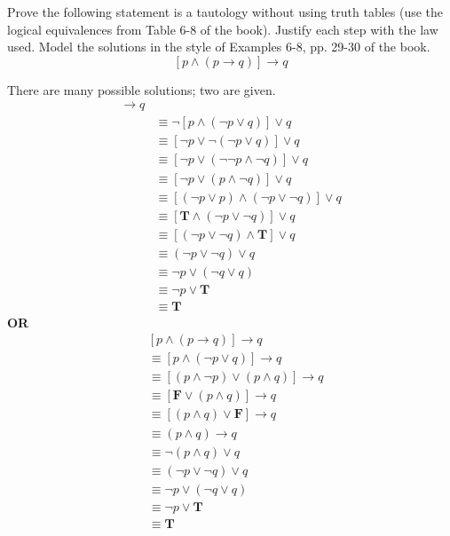 \documentclass[12pt,addpoints]{exam}
\newcommand{\ra}{\rightarrow}
\begin{document}
\begin{questions}
\question[10] Prove the following statement is a tautology without using truth tables (use the logical equivalences from Table 6-8 of the book).  Justify each step with the law used.  Model the solutions in the style of Examples 6-8, pp. 29-30 of the book.
\[ [ p \wedge (p \ra q) ] \ra q \]
    \ifprintanswers
        \vspace{-40pt}
    \fi
\begin{solution}  There are many possible solutions; two are given.
\small
	\begin{align*}
	[p \wedge (p \ra q)] \ra q \\
	 & \equiv \neg [p \wedge (\neg p \vee q)] \vee q \tag{Table7.1, x2} \\
	 & \equiv [\neg p \vee \neg (\neg p \vee q)] \vee q \tag{DeMorgan's} \\
	 & \equiv [\neg p \vee (\neg \neg p \wedge \neg q)] \vee q \tag{DeMorgan's} \\
	 & \equiv [\neg p \vee (p \wedge \neg q)] \vee q \tag{Double Negation} \\
	 & \equiv [(\neg p \vee p) \wedge (\neg p \vee \neg q)] \vee q \tag{Distributive} \\
	 & \equiv [\mathbf{T} \wedge (\neg p \vee \neg q)] \vee q \tag{Negation} \\
	 & \equiv [(\neg p \vee \neg q) \wedge \mathbf{T}] \vee q \tag{Commutative} \\
	 & \equiv (\neg p \vee \neg q) \vee q \tag{Identity} \\
	 & \equiv \neg p \vee (\neg q \vee q) \tag{Associative} \\
	 & \equiv \neg p \vee \mathbf{T} \tag{Negation} \\
	 & \equiv \mathbf{T} \tag{Domination}
	 \end{align*}
	\textbf{OR}
	\begin{align*}
	& [p \wedge (p \ra q)] \ra q  \\
	& \equiv [p \wedge (\neg p \vee q)] \ra q \tag{Table 7, rule1} \\
	& \equiv [(p \wedge \neg p) \vee (p \wedge q)] \ra q \tag{Distributive} \\
	& \equiv [\mathbf{F} \vee (p \wedge q)] \ra q \tag{Negation} \\
	& \equiv [(p \wedge q) \vee \mathbf{F}] \ra q \tag{Commutative} \\
	& \equiv (p \wedge q) \ra q \tag{Identity} \\
	& \equiv \neg (p \wedge q) \vee q \tag{Table 7, rule 1} \\
	& \equiv (\neg p \vee \neg q) \vee q \tag{DeMorgan's} \\
	& \equiv \neg p \vee (\neg q \vee q) \tag{Associative} \\
	& \equiv \neg p \vee \mathbf{T} \tag{Negation} \\
	& \equiv \mathbf{T} \tag{Domination}
	\end{align*}
\end{solution}



\end{questions}
\end{document}
